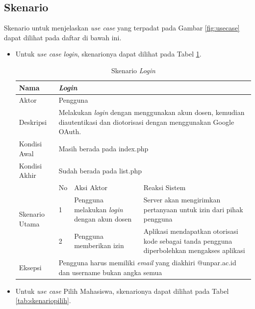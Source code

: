 \subsection{Skenario}

Skenario untuk menjelaskan {\it use case} yang terpadat pada Gambar \ref{fig:usecase}
dapat dilihat pada daftar di bawah ini.
\begin{itemize}
\item Untuk {\it use case} {\it login}, skenarionya dapat dilihat pada Tabel \ref{tab:skenariologin}.

\begin{table}[ht]
\centering
\caption[Tabel Skenario {\it Login}]{Skenario {\it Login}}
\label{tab:skenariologin}
\begin{tabular}{|p{1.4cm}|p{0.4cm}|p{2cm}|p{2cm}|p{2cm}|p{2cm}|}
\hline
Nama & \multicolumn{5}{p{8cm}|}{{\it Login}} \\ \hline
Aktor & \multicolumn{5}{p{8cm}|}{Pengguna} \\ \hline
Deskripsi & \multicolumn{5}{p{8cm}|}{Melakukan {\it login} dengan menggunakan akun dosen, kemudian diautentikasi dan diotorisasi dengan menggunakan Google OAuth.} \\ \hline
Kondisi Awal & \multicolumn{5}{p{8cm}|}{Masih berada pada index.php} \\ \hline
Kondisi Akhir & \multicolumn{5}{p{8cm}|}{Sudah berada pada list.php}
\\ \hline
\multirow{3}{*}{\parbox{1.4cm}{Skenario Utama}} & No &
\multicolumn{2}{p{4cm}|}{Aksi Aktor} & \multicolumn{2}{p{4cm}|}{Reaksi Sistem}
\\ \cline{2-6}
& 1 & \multicolumn{2}{p{4cm}|}{Pengguna melakukan {\it login} dengan akun dosen} &
\multicolumn{2}{p{4cm}|}{Server akan mengirimkan pertanyaan untuk izin dari pihak pengguna} \\
\cline{2-6} & 2 & \multicolumn{2}{p{4cm}|}{Pengguna memberikan izin} &
\multicolumn{2}{p{4cm}|}{Aplikasi mendapatkan otorisasi kode sebagai tanda pengguna diperbolehkan mengakses aplikasi} \\ \hline
Eksepsi & \multicolumn{5}{p{8cm}|}{Pengguna harus memiliki {\it email} yang diakhiri @unpar.ac.id dan username bukan angka semua} \\ \hline
\end{tabular}
\end{table}

\item Untuk {\it use case} Pilih Mahasiswa, skenarionya dapat dilihat pada Tabel \ref{tab:skenariopilih}.


\end{itemize}
